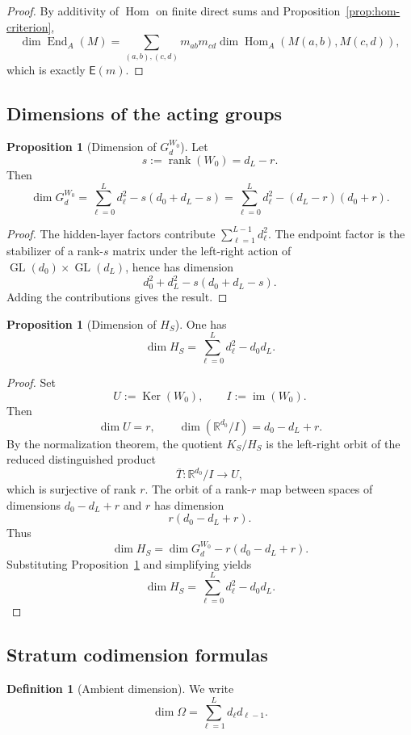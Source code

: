 \documentclass[11pt]{article}
\newcommand{\rk}{\operatorname{rank}}
\newcommand{\im}{\operatorname{im}}
\newcommand{\Ker}{\operatorname{Ker}}
\newcommand{\GL}{\operatorname{GL}}
\newcommand{\Hom}{\operatorname{Hom}}
\newcommand{\End}{\operatorname{End}}
\newcommand{\R}{\mathbb{R}}
\theoremstyle{definition}
\newtheorem{proposition}[theorem]{Proposition}
\newtheorem{definition}[theorem]{Definition}
\begin{document}
\begin{proof}
By additivity of \(\Hom\) on finite direct sums and
Proposition~\ref{prop:hom-criterion},
\[
\dim \End_A(M)
=
\sum_{(a,b),(c,d)}
m_{ab}m_{cd}\dim \Hom_A(M(a,b),M(c,d)),
\]
which is exactly \(\mathsf E(m)\).
\end{proof}

\subsection{Dimensions of the acting groups}

\begin{proposition}[Dimension of \(G_d^{W_0}\)]
\label{prop:dim-GW0}
Let
\[
s:=\rk(W_0)=d_L-r.
\]
Then
\[
\dim G_d^{W_0}
=
\sum_{\ell=0}^L d_\ell^2-s(d_0+d_L-s)
=
\sum_{\ell=0}^L d_\ell^2-(d_L-r)(d_0+r).
\]
\end{proposition}

\begin{proof}
The hidden-layer factors contribute \(\sum_{\ell=1}^{L-1} d_\ell^2\). The
endpoint factor is the stabilizer of a rank-\(s\) matrix under the left-right
action of \(\GL(d_0)\times \GL(d_L)\), hence has dimension
\[
d_0^2+d_L^2-s(d_0+d_L-s).
\]
Adding the contributions gives the result.
\end{proof}

\begin{proposition}[Dimension of \(H_S\)]
\label{prop:dim-HS}
One has
\[
\dim H_S=\sum_{\ell=0}^L d_\ell^2-d_0d_L.
\]
\end{proposition}

\begin{proof}
Set
\[
U:=\Ker(W_0),
\qquad
I:=\im(W_0).
\]
Then
\[
\dim U=r,
\qquad
\dim(\R^{d_0}/I)=d_0-d_L+r.
\]
By the normalization theorem, the quotient \(K_S/H_S\) is the left-right orbit
of the reduced distinguished product
\[
\overline T:\R^{d_0}/I\to U,
\]
which is surjective of rank \(r\). The orbit of a rank-\(r\) map between spaces
of dimensions \(d_0-d_L+r\) and \(r\) has dimension
\[
r(d_0-d_L+r).
\]
Thus
\[
\dim H_S
=
\dim G_d^{W_0}-r(d_0-d_L+r).
\]
Substituting Proposition~\ref{prop:dim-GW0} and simplifying yields
\[
\dim H_S=\sum_{\ell=0}^L d_\ell^2-d_0d_L.
\]
\end{proof}

\subsection{Stratum codimension formulas}

\begin{definition}[Ambient dimension]
We write
\[
\dim \Omega=\sum_{\ell=1}^L d_\ell d_{\ell-1}.
\]
\end{definition}
\end{document}
